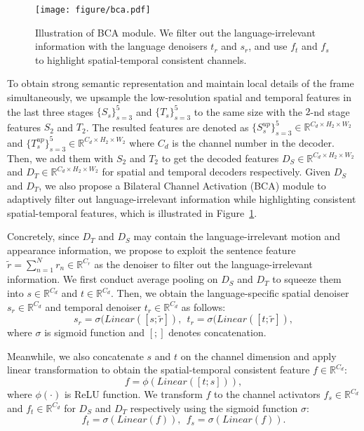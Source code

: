 \documentclass[10pt,twocolumn,letterpaper]{article}
\begin{document}
\begin{figure}[t]
	\centering
		\texttt{[image: figure/bca.pdf]}
	\caption{Illustration of BCA module. We filter out the language-irrelevant information with the language denoisers $t_r$ and $s_r$, and use $f_t$ and $f_s$ to highlight spatial-temporal consistent channels.}
\label{fig:tfm}
	
\end{figure}

To obtain strong semantic representation and maintain local details of the frame simultaneously, we upsample the low-resolution spatial and temporal features in the last three stages $\{S_s\}_{s=3}^{5}$ and $\{T_s\}_{s=3}^{5}$ to the same size with the $2$-nd stage features $S_2$ and $T_2$.
The resulted features are denoted as $\{S_s^{up}\}_{s=3}^{5}\in \mathbb{R}^{C_d\times H_2\times W_2}$ and $\{T_s^{up}\}_{s=3}^{5}\in \mathbb{R}^{C_d\times H_2\times W_2}$ where $C_d$ is the channel number in the decoder.
Then, we add them with $S_2$ and $T_2$ to get the decoded features $D_S\in \mathbb{R}^{C_d\times H_2\times W_2}$ and $D_T\in \mathbb{R}^{C_d\times H_2\times W_2}$ for spatial and temporal decoders respectively.
Given $D_S$ and $D_T$, we also propose a Bilateral Channel Activation (BCA) module to adaptively filter out language-irrelevant information while highlighting consistent spatial-temporal features, which is illustrated in Figure~\ref{fig:tfm}.

Concretely, since $D_T$ and $D_S$ may contain the language-irrelevant motion and appearance information, we propose to exploit the sentence feature $\widetilde{r}=\sum_{n=1}^Nr_n \in \mathbb{R}^{C_r}$ as the denoiser to filter out the language-irrelevant information.
We first conduct average pooling on $D_S$ and $D_T$ to squeeze them into $s\in \mathbb{R}^{C_d}$ and $t\in \mathbb{R}^{C_d}$. Then, we obtain the language-specific spatial denoiser $s_r\in \mathbb{R}^{C_d}$ and temporal denoiser $t_r \in \mathbb{R}^{C_d}$ as follows:
\begin{equation}
    s_r=\sigma(\textit{Linear}([s;\widetilde{r}]),~~t_r=\sigma(\textit{Linear}([t;\widetilde{r}]),
\end{equation}
where $\sigma$ is sigmoid function and $[;]$ denotes concatenation.

Meanwhile, we also concatenate $s$ and $t$ on the channel dimension and apply linear transformation to obtain the spatial-temporal consistent feature $f\in \mathbb{R}^{C_d}$: 
\begin{equation}
    f=\phi(\textit{Linear}([t;s])),
\end{equation}
where $\phi(\cdot)$ is ReLU \cite{nair2010rectified} function. We transform $f$ to the channel activators $f_s\in \mathbb{R}^{C_d}$ and $f_t\in \mathbb{R}^{C_d}$ for $D_S$ and $D_T$ respectively using the sigmoid function $\sigma$:
\begin{equation}
    f_t=\sigma(\textit{Linear}(f)),~~f_s=\sigma(\textit{Linear}(f)).
\end{equation}
\end{document}
